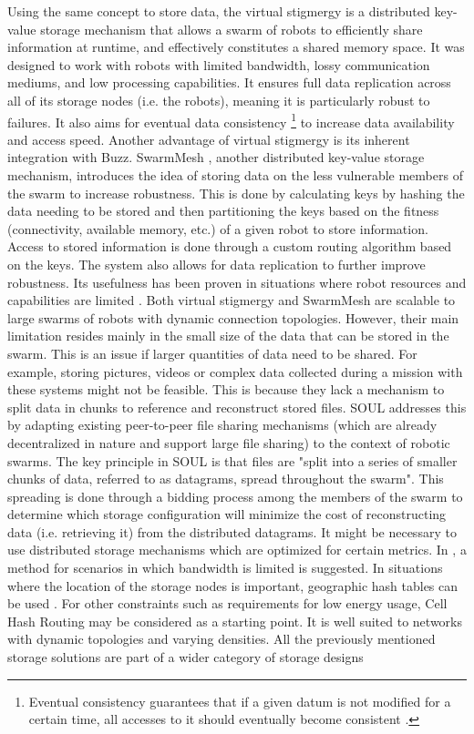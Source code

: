 Using the same concept to store data, the virtual stigmergy \cite{pinciroliTuple2016} is a distributed key-value storage mechanism that allows a swarm of robots to efficiently share information at runtime, and effectively constitutes a shared memory space. It was designed to work with robots with limited bandwidth, lossy communication mediums, and low processing capabilities. It ensures full data replication across all of its storage nodes (i.e. the robots), meaning it is particularly robust to failures. It also aims for eventual data consistency \footnote{Eventual consistency guarantees that if a given datum is not modified for a certain time, all accesses to it should eventually become consistent \cite{vogels2009eventually}.} to increase data availability and access speed. Another advantage of virtual stigmergy is its inherent integration with Buzz. SwarmMesh \cite{majcherczykSwarmmesh2020}, another distributed key-value storage mechanism, introduces the idea of storing data on the less vulnerable members of the swarm to increase robustness. This is done by calculating keys by hashing the data needing to be stored and then partitioning the keys based on the fitness (connectivity, available memory, etc.) of a given robot to store information. Access to stored information is done through a custom routing algorithm based on the keys. The system also allows for data replication to further improve robustness. Its usefulness has been proven in situations where robot resources and capabilities are limited \cite{majcherczyk2021distributed}. Both virtual stigmergy and SwarmMesh are scalable to large swarms of robots with dynamic connection topologies. However, their main limitation resides mainly in the small size of the data that can be stored in the swarm. This is an issue if larger quantities of data need to be shared. For example, storing pictures, videos or complex data collected during a mission with these systems might not be feasible. This is because they lack a mechanism to split data in chunks to reference and reconstruct stored files. SOUL \cite{varadharajan2020soul} addresses this by adapting existing peer-to-peer file sharing mechanisms (which are already decentralized in nature and support large file sharing) to the context of robotic swarms. The key principle in SOUL is that files are "split into a series of smaller chunks of data, referred to as datagrams, spread throughout the swarm". This spreading is done through a bidding process among the members of the swarm to determine which storage configuration will minimize the cost of reconstructing data (i.e. retrieving it) from the distributed datagrams. It might be necessary to use distributed storage mechanisms which are optimized for certain metrics. In \cite{amigoni2017multirobot}, a method for scenarios in which bandwidth is limited is suggested. In situations where the location of the storage nodes is important, geographic hash tables can be used \cite{wu2008ldht,ratnasamy2002ght,ahullo2008supporting}. For other constraints such as requirements for low energy usage, Cell Hash Routing  \cite{araujo2005chr} may be considered as a starting point. It is well suited to networks with dynamic topologies and varying densities. All the previously mentioned storage solutions are part of a wider category of storage designs 